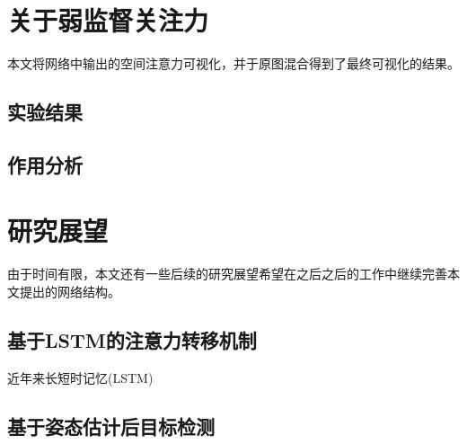 \section{关于弱监督关注力}
\label{sec:weaksuperatten}
本文将网络中输出的空间注意力可视化，并于原图混合得到了最终可视化的结果。
\subsection{实验结果}
\label{subsec:attenexp}

\subsection{作用分析}
\label{subsec:attenstudy}

\section{研究展望}
\label{sec:future}
由于时间有限，本文还有一些后续的研究展望希望在之后之后的工作中继续完善本文提出的网络结构。
\subsection{基于LSTM的注意力转移机制}
\label{subsec:lstmatten}
近年来长短时记忆(LSTM)
\subsection{基于姿态估计后目标检测}
\label{subsec:semisuperdetect}